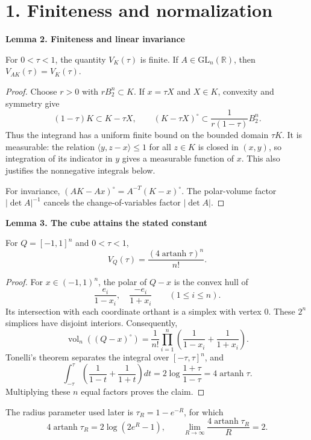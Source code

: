 \documentclass[11pt,a4paper]{article}
\newenvironment{statement}[1]{\begin{tcolorbox}[proofbox]\textbf{#1}\par\smallskip}{\end{tcolorbox}}
\newcommand{\R}{\mathbb R}
\newcommand{\vol}{\operatorname{vol}_n}
\newcommand{\artanh}{\operatorname{artanh}}
\newcommand{\pair}[2]{\langle #1,#2\rangle}
\newcommand{\sect}[1]{\section*{#1}}
\begin{document}
\newpage
\sect{1. Finiteness and normalization}
\begin{statement}{Lemma 2. Finiteness and linear invariance}
For $0<\tau<1$, the quantity $V_K(\tau)$ is finite. If
$A\in\mathrm{GL}_n(\R)$, then $V_{AK}(\tau)=V_K(\tau)$.
\end{statement}
\begin{proof}
Choose $r>0$ with $rB_2^n\subset K$. If $x=\tau X$ and $X\in K$, convexity
and symmetry give
\[
 (1-\tau)K\subset K-\tau X,
 \qquad (K-\tau X)^\circ\subset\frac1{r(1-\tau)}B_2^n.
\]
Thus the integrand has a uniform finite bound on the bounded domain $\tau K$.
It is measurable: the relation $\pair y{z-x}\leq1$ for all $z\in K$ is
closed in $(x,y)$, so integration of its indicator in $y$ gives a measurable
function of $x$. This also justifies the nonnegative integrals below.

For invariance, $(AK-Ax)^\circ=A^{-T}(K-x)^\circ$. The polar-volume factor
$|\det A|^{-1}$ cancels the change-of-variables factor $|\det A|$.
\end{proof}

\begin{statement}{Lemma 3. The cube attains the stated constant}
For $Q=[-1,1]^n$ and $0<\tau<1$,
\[
 V_Q(\tau)=\frac{(4\artanh\tau)^n}{n!}.
\]
\end{statement}
\begin{proof}
For $x\in(-1,1)^n$, the polar of $Q-x$ is the convex hull of
\[
 \frac{e_i}{1-x_i},\quad\frac{-e_i}{1+x_i}\qquad(1\leq i\leq n).
\]
Its intersection with each coordinate orthant is a simplex with vertex
$0$. These $2^n$ simplices have disjoint interiors. Consequently,
\[
 \vol((Q-x)^\circ)
 =\frac1{n!}\prod_{i=1}^n
 \left(\frac1{1-x_i}+\frac1{1+x_i}\right).
\]
Tonelli's theorem separates the integral over $[-\tau,\tau]^n$, and
\[
 \int_{-\tau}^{\tau}\left(\frac1{1-t}+\frac1{1+t}\right)dt
 =2\log\frac{1+\tau}{1-\tau}=4\artanh\tau.
\]
Multiplying these $n$ equal factors proves the claim.
\end{proof}

The radius parameter used later is $\tau_R=1-e^{-R}$, for which
\begin{equation}\label{radius}
 4\artanh\tau_R=2\log(2e^R-1),\qquad
 \lim_{R\to\infty}\frac{4\artanh\tau_R}{R}=2.
\end{equation}
\end{document}
